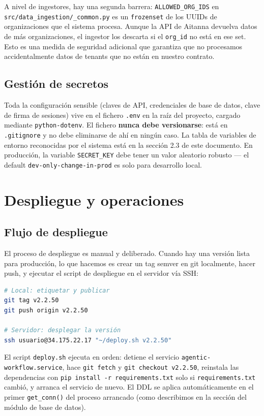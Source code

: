\documentclass[12pt, a4paper]{article}
\begin{document}
A nivel de ingestores, hay una segunda barrera: \texttt{ALLOWED\_ORG\_IDS} en \texttt{src/data\_ingestion/\_common.py} es un \texttt{frozenset} de los UUIDs de organizaciones que el sistema procesa. Aunque la API de Aitanna devuelva datos de más organizaciones, el ingestor los descarta si el \texttt{org\_id} no está en ese set. Esto es una medida de seguridad adicional que garantiza que no procesamos accidentalmente datos de tenants que no están en nuestro contrato.

\subsection{Gestión de secretos}

Toda la configuración sensible (claves de API, credenciales de base de datos, clave de firma de sesiones) vive en el fichero \texttt{.env} en la raíz del proyecto, cargado mediante \texttt{python-dotenv}. El fichero \textbf{nunca debe versionarse}: está en \texttt{.gitignore} y no debe eliminarse de ahí en ningún caso. La tabla de variables de entorno reconocidas por el sistema está en la sección 2.3 de este documento. En producción, la variable \texttt{SECRET\_KEY} debe tener un valor aleatorio robusto — el default \texttt{dev-only-change-in-prod} es solo para desarrollo local.

\section{Despliegue y operaciones}

\subsection{Flujo de despliegue}

El proceso de despliegue es manual y deliberado. Cuando hay una versión lista para producción, lo que hacemos es crear un tag semver en git localmente, hacer push, y ejecutar el script de despliegue en el servidor vía SSH:

\begin{lstlisting}[language=bash]
# Local: etiquetar y publicar
git tag v2.2.50
git push origin v2.2.50

# Servidor: desplegar la versión
ssh usuario@34.175.22.17 "~/deploy.sh v2.2.50"
\end{lstlisting}

El script \texttt{deploy.sh} ejecuta en orden: detiene el servicio \texttt{agentic-workflow.service}, hace \texttt{git fetch} y \texttt{git checkout v2.2.50}, reinstala las dependencias con \texttt{pip install -r requirements.txt} solo si \texttt{requirements.txt} cambió, y arranca el servicio de nuevo. El DDL se aplica automáticamente en el primer \texttt{get\_conn()} del proceso arrancado (como describimos en la sección del módulo de base de datos).
\end{document}
